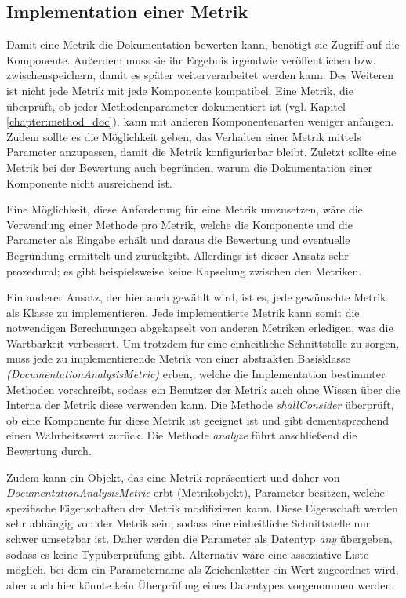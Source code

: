 \subsection{Implementation einer Metrik}\label{chapter:metric_impl}
Damit eine Metrik die Dokumentation bewerten kann, benötigt sie Zugriff auf die Komponente. Außerdem muss sie ihr Ergebnis irgendwie veröffentlichen bzw. zwischenspeichern, damit es später weiterverarbeitet werden kann. Des Weiteren ist nicht jede Metrik mit jede Komponente kompatibel. Eine Metrik, die überprüft, ob jeder Methodenparameter dokumentiert ist (vgl. Kapitel \ref{chapter:method_doc}), kann mit anderen Komponentenarten weniger anfangen. Zudem sollte es die Möglichkeit geben, das Verhalten einer Metrik mittels Parameter anzupassen, damit die Metrik konfigurierbar bleibt. Zuletzt sollte eine Metrik bei der Bewertung auch begründen, warum die Dokumentation einer Komponente nicht ausreichend ist.

Eine Möglichkeit, diese Anforderung für eine Metrik umzusetzen, wäre die Verwendung einer Methode pro Metrik, welche die Komponente und die Parameter als Eingabe erhält und daraus die Bewertung und eventuelle Begründung ermittelt und zurückgibt. Allerdings ist dieser Ansatz sehr prozedural; es gibt beispielsweise keine Kapselung zwischen den Metriken.  

Ein anderer Ansatz, der hier auch gewählt wird, ist es, jede gewünschte Metrik als Klasse zu implementieren. Jede implementierte Metrik kann somit die notwendigen Berechnungen abgekapselt von anderen Metriken erledigen, was die Wartbarkeit verbessert. Um trotzdem für eine einheitliche Schnittstelle zu sorgen, muss jede zu implementierende Metrik von einer abstrakten Basisklasse \textit{(DocumentationAnalysisMetric)} erben,, welche die Implementation bestimmter Methoden vorschreibt, sodass ein Benutzer der Metrik auch ohne Wissen über die Interna der Metrik diese verwenden kann. Die Methode \textit{shallConsider} überprüft, ob eine Komponente für diese Metrik ist geeignet ist und gibt dementsprechend einen Wahrheitswert zurück. Die Methode \textit{analyze} führt anschließend die Bewertung durch.

Zudem kann ein Objekt, das eine Metrik repräsentiert und daher von \textit{DocumentationAnalysisMetric} erbt (Metrikobjekt), Parameter besitzen, welche spezifische Eigenschaften der Metrik modifizieren kann. Diese Eigenschaft werden sehr abhängig von der Metrik sein, sodass eine einheitliche Schnittstelle nur schwer umsetzbar ist. Daher werden die Parameter als Datentyp \textit{any} übergeben, sodass es keine Typüberprüfung gibt. Alternativ wäre eine assoziative Liste möglich, bei dem ein Parametername als Zeichenketter ein Wert zugeordnet wird, aber auch hier könnte kein Überprüfung eines Datentypes vorgenommen werden. 

